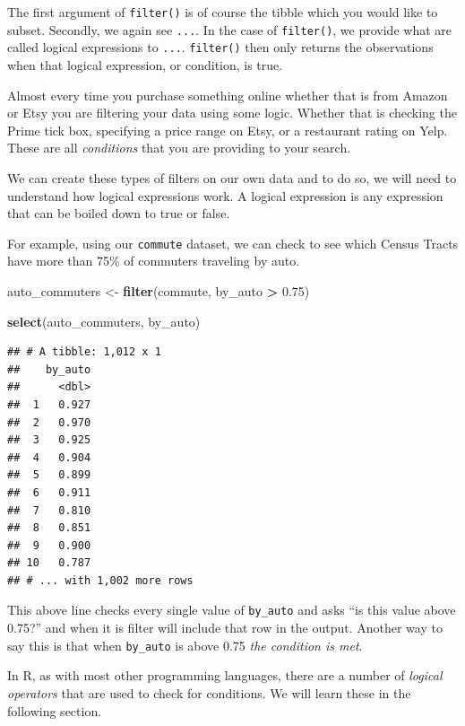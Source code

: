 \documentclass[
]{book}
\newenvironment{Shaded}{\begin{snugshade}}{\end{snugshade}}
\newcommand{\FloatTok}[1]{\textcolor[rgb]{0.00,0.00,0.81}{#1}}
\newcommand{\KeywordTok}[1]{\textcolor[rgb]{0.13,0.29,0.53}{\textbf{#1}}}
\newcommand{\NormalTok}[1]{#1}
\newcommand{\OperatorTok}[1]{\textcolor[rgb]{0.81,0.36,0.00}{\textbf{#1}}}
\newcommand{\StringTok}[1]{\textcolor[rgb]{0.31,0.60,0.02}{#1}}
\begin{document}
The first argument of \texttt{filter()} is of course the tibble which you would like to subset. Secondly, we again see \texttt{...}. In the case of \texttt{filter()}, we provide what are called logical expressions to \texttt{...}. \texttt{filter()} then only returns the observations when that logical expression, or condition, is true.

Almost every time you purchase something online whether that is from Amazon or Etsy you are filtering your data using some logic. Whether that is checking the Prime tick box, specifying a price range on Etsy, or a restaurant rating on Yelp. These are all \emph{conditions} that you are providing to your search.

We can create these types of filters on our own data and to do so, we will need to understand how logical expressions work. A logical expression is any expression that can be boiled down to true or false.

For example, using our \texttt{commute} dataset, we can check to see which Census Tracts have more than 75\% of commuters traveling by auto.

\begin{Shaded}
\begin{Highlighting}[]
\NormalTok{auto\_commuters \textless{}{-}}\StringTok{ }\KeywordTok{filter}\NormalTok{(commute, by\_auto }\OperatorTok{\textgreater{}}\StringTok{ }\FloatTok{0.75}\NormalTok{)}

\KeywordTok{select}\NormalTok{(auto\_commuters, by\_auto)}
\end{Highlighting}
\end{Shaded}

\begin{verbatim}
## # A tibble: 1,012 x 1
##    by_auto
##      <dbl>
##  1   0.927
##  2   0.970
##  3   0.925
##  4   0.904
##  5   0.899
##  6   0.911
##  7   0.810
##  8   0.851
##  9   0.900
## 10   0.787
## # ... with 1,002 more rows
\end{verbatim}

This above line checks every single value of \texttt{by\_auto} and asks ``is this value above 0.75?'' and when it is filter will include that row in the output. Another way to say this is that when \texttt{by\_auto} is above 0.75 \emph{the condition is met}.

In R, as with most other programming languages, there are a number of \emph{logical operators} that are used to check for conditions. We will learn these in the following section.
\end{document}
